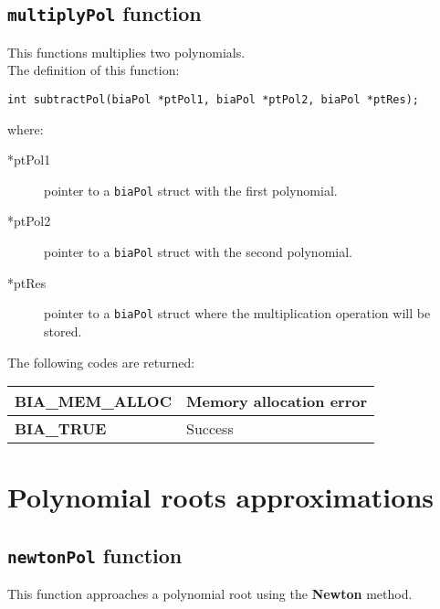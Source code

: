 \subsection{\texttt{multiplyPol} function}

This functions multiplies two polynomials.\\

The definition of this function:
%
\begin{verbatim}
int subtractPol(biaPol *ptPol1, biaPol *ptPol2, biaPol *ptRes);
\end{verbatim}
%
where:
%
\begin{description}
\item[*ptPol1] pointer to a \texttt{biaPol} struct with the first polynomial.
\item[*ptPol2] pointer to a \texttt{biaPol} struct with the second polynomial.
\item[*ptRes] pointer to a \texttt{biaPol} struct where the multiplication operation will be stored.
\end{description}
%
The following codes are returned:
%
\begin{center}
\begin{tabular}{|l|l|}
\hline
\textbf{BIA\_MEM\_ALLOC} & Memory allocation error \\
\hline
\textbf{BIA\_TRUE} & Success \\
\hline
\end{tabular}
\end{center}
%
%

\section{Polynomial roots approximations}

\subsection{\texttt{newtonPol} function}

This function approaches a polynomial root using the \textbf{Newton} method.\\

